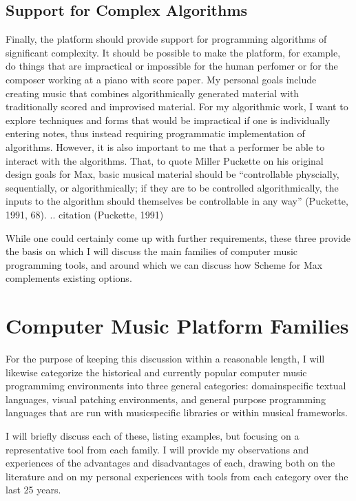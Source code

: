 \documentclass[letterpaper,10pt,english]{sphinxmanual}
\begin{document}
\subsection{Support for Complex Algorithms}
\label{\detokenize{background:support-for-complex-algorithms}}
\sphinxAtStartPar
Finally, the platform should provide support for programming algorithms of significant complexity.
It should be possible to make the platform, for example, do things that are impractical
or impossible for the human perfomer or for the composer working at a piano with score paper.
My personal goals include creating music that combines algorithmically generated
material with traditionally scored and improvised material.
For my algorithmic work, I want to explore techniques and forms that would be impractical
if one is individually entering notes, thus instead requiring programmatic implementation of
algorithms.
However, it is also important to me that a performer be able to interact with the algorithms.
That, to quote Miller Puckette on his original design goals for Max,
basic musical material should be “controllable physcially, sequentially, or algorithmically;
if they are to be controlled algorithmically, the inputs to the algorithm should
themselves be controllable in any way” (Puckette, 1991, 68).
.. citation (Puckette, 1991)

\sphinxAtStartPar
While one could certainly come up with further requirements, these three provide the basis
on which I will discuss the main families of computer music programming tools, and
around which we can discuss how Scheme for Max complements existing options.


\section{Computer Music Platform Families}
\label{\detokenize{background:computer-music-platform-families}}
\sphinxAtStartPar
For the purpose of keeping this discussion within a reasonable length,
I will likewise categorize the historical and currently popular computer music programmimg
environments into three general categories: domain\sphinxhyphen{}specific textual languages, visual patching
environments, and general purpose programming languages that are run with music\sphinxhyphen{}specific libraries
or within musical frameworks.

\sphinxAtStartPar
I will briefly discuss each of these, listing examples, but focusing on a representative tool from each family.
I will provide my observations and experiences of the advantages and disadvantages of each,
drawing both on the literature and on my personal experiences with tools from each category
over the last 25 years.
\end{document}
